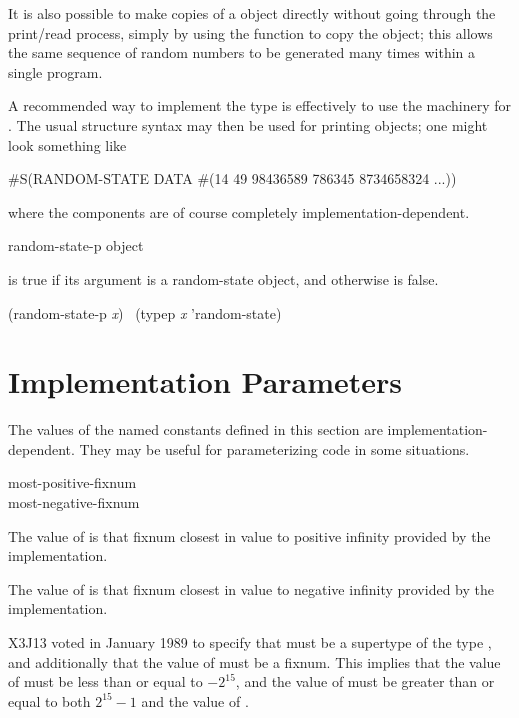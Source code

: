 \begin{defun}[Function]
\begin{rationale}
It is also possible to make copies of a  object
directly without going through the print/read process, simply by
using the  function to copy the object; this allows
the same sequence of random numbers to be generated many times
within a single program.
\end{rationale}
\betweennoterule
\begin{implementation}
A recommended way to implement the type 
is effectively to use the machinery for .
The usual structure syntax may then be used for printing 
objects; one might look something like
\begin{lisp}
\#S(RANDOM-STATE DATA \#(14 49 98436589 786345 8734658324 ...))
\end{lisp}
where the components are of course completely implementation-dependent.
\end{implementation}
\afternoterule
\end{defun}

\begin{defun}[Function]
random-state-p object

 is true if its argument is a random-state object,
and otherwise is false.
\begin{lisp}
(random-state-p {\it x}) \EQ\ (typep {\it x} 'random-state)
\end{lisp}
\end{defun}

\section{Implementation Parameters}

The values of the named constants defined in this section are
implementation-dependent.  They may be useful for parameterizing
code in some situations.

\begin{defun}[Constant]
most-positive-fixnum \\
most-negative-fixnum

The value of  is that fixnum closest in value to
positive infinity provided by the implementation.

The value of  is that fixnum closest in value to
negative infinity provided by the implementation.

\begin{new}
X3J13 voted in January 1989
to specify that  must be a supertype
of the type , and additionally that the value
of  must be a fixnum.  This implies that the value
of  must be less than or equal to $-2^{15}$,
and the value of  must be greater than or equal to
both $2^{15}-1$ and the value of .
\end{new}
\end{defun}

